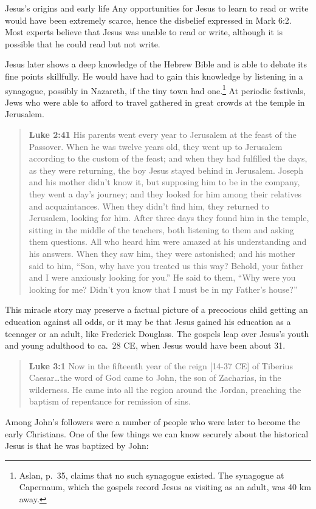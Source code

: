 \documentclass[8pt]{article}
\newcommand{\quotesize}{\large{}}
\newenvironment{quotetext}{\begin{quote}\quotesize}{\end{quote}}
\newcommand{\bible}[2]{\begin{quotetext}\textbf{#1} #2\end{quotetext}}
\newcommand{\luke}[2]{\bible{Luke #1}{#2}}
\begin{document}
\begin{section}{Jesus's origins and early life}
Any opportunities for Jesus to learn to read or write would have been
extremely scarce, hence the disbelief expressed in Mark 6:2. Most
experts believe that Jesus was unable to read or write, although it is
possible that he could read but not write.

Jesus later shows a deep knowledge of the Hebrew Bible and is able to debate its
fine points skillfully. He would have had to gain this knowledge by listening in
a synagogue, possibly in Nazareth, if the tiny town had one.\footnote{Aslan, p.~35, claims that no such synagogue existed. The
synagogue at Capernaum, which the gospels record Jesus as visiting as an adult, was 40 km away.} At periodic festivals,
Jews who were able to afford to travel gathered in great crowds at the temple in
Jerusalem.

\luke{2:41}{His parents went every year to Jeru\-salem at the feast of the Passover.  When he was twelve years old, they went up to Jerusalem according to the custom of the feast;  and when they had fulfilled the days, as they were returning, the boy Jesus stayed behind in Jerusalem. Joseph and his mother didn’t know it,  but supposing him to be in the company, they went a day’s journey; and they looked for him among their relatives and acquaintances.  When they didn’t find him, they returned to Jerusalem, looking for him.  After three days they found him in the temple, sitting in the middle of the teachers, both listening to them and asking them questions.  All who heard him were amazed at his understanding and his answers.  When they saw him, they were astonished; and his mother said to him, ``Son, why have you treated us this way? Behold, your father and I were anxiously looking for you.''
 He said to them, ``Why were you looking for me? Didn’t you know that I must be in my Father’s house?''}

This miracle story may preserve a factual picture of a precocious child getting an education against all odds, or
it may be that Jesus gained his education as a teenager or an adult, like Frederick Douglass. The gospels leap
over Jesus's youth and young adulthood to ca.~28 CE, when Jesus would have been about 31.

\luke{3:1}{Now in the fifteenth year of the reign [14-37 CE] of Tiberius
Caesar\ldots the word of God came to John, the son of Zacharias, in
the wilderness.  He came into all the region around the Jordan,
preaching the baptism of repentance for remission of sins.}

Among John's followers were a number of people who were later to become the early Christians.
One of the few things we can know securely about the historical Jesus is that he was baptized
by John:


\end{section}
\end{document}
